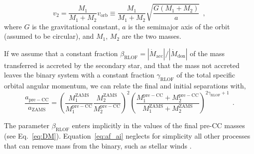 \documentclass{aa}
\DeclareRobustCommand{\Eqref}[1]{Eq.~\ref{#1}}
\begin{document}
\begin{equation}
  \label{eq:v2}
  v_2 =
  \frac{M_1}{M_1+M_2} v_\mathrm{orb} \equiv \frac{M_1}{M_1+M_2} \sqrt{\frac{G(M_1+M_2)}{a}}
  \ \ ,
\end{equation}
where $G$ is the gravitational constant, $a$ is the semimajor axis of
the orbit (assumed to be circular), and $M_1$, $M_2$ are the two
masses.

If we assume that a constant fraction
$\beta_\mathrm{RLOF}=|\dot{M}_\mathrm{acc}|/|\dot{M}_\mathrm{don}|$ of the mass
transferred is accreted by the secondary star, and that the mass not
accreted leaves the binary system with a constant fraction
$\gamma_\mathrm{RLOF}$ of the total
specific orbital angular momentum, we can relate the final and initial
separations with,
\begin{equation}
  \label{eq:af_ai}
  \frac{a_\mathrm{pre-CC}}{a_\mathrm{ZAMS}} =
  \left(\frac{M_1^\mathrm{ZAMS}}{M_1^\mathrm{pre-CC}}\frac{M_2^\mathrm{ZAMS}}{M_2^\mathrm{pre-CC}}\right)^2\left(\frac{M_1^\mathrm{pre-CC}+M_2^\mathrm{pre-CC}}{M_1^\mathrm{ZAMS}+M_2^\mathrm{ZAMS}}\right)^{2\gamma_\mathrm{RLOF}+1}
  \ \ .
\end{equation}

The parameter $\beta_\mathrm{RLOF}$ enters implicitly in the values of
the final pre-CC masses (see \Eqref{eq:DM}). Equation~\ref{eq:af_ai} neglects for simplicity all other processes that can
remove mass from the binary, such as stellar winds \citep[see ][for a
more elaborate expression]{soberman:97}.
\end{document}
